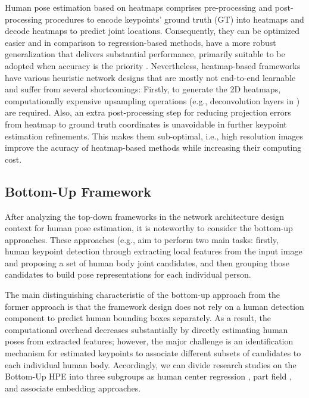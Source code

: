 Human pose estimation based on heatmaps comprises pre-processing and post-processing procedures to encode keypoints' ground truth (GT) into heatmaps and decode heatmaps to predict joint locations. Consequently, they can be optimized easier and in comparison to regression-based methods, have a more robust generalization that delivers substantial performance, primarily suitable to be adopted when accuracy is the priority \cite{pfister_flowing_2015}. Nevertheless, heatmap-based frameworks have various heuristic network designs that are mostly not end-to-end learnable and suffer from several shortcomings: Firstly, to generate the 2D heatmaps, computationally expensive upsampling operations (e.g., deconvolution layers in \cite{yixing_gao_user_2015}) are required. Also, an extra post-processing step for reducing projection errors from heatmap to ground truth coordinates is unavoidable in further keypoint estimation refinements. This makes them sub-optimal, i.e., high resolution images improve the acuracy of heatmap-based methods while increasing their computing cost.


\subsection{Bottom-Up Framework}
 
After analyzing the top-down frameworks in the network architecture design context for human pose estimation, it is noteworthy to consider the bottom-up approaches. These approaches (e.g.,\cite{micilotta_real-time_2006, cheng_higherhrnet_2020, fieraru_learning_2018, jin_differentiable_2020, kreiss_pifpaf_2019, nie_single-stage_2019,insafutdinov_arttrack_2017, insafutdinov_deepercut_2016, newell_associative_2017, pishchulin_deepcut_2016, tian_directpose_2019} aim to perform two main tasks: firstly, human keypoint detection through extracting local features from the input image and proposing a set of human body joint candidates, and then grouping those candidates to build pose representations for each individual person. 

The main distinguishing characteristic of the bottom-up approach from the former approach is that the framework design does not rely on a human detection component to predict human bounding boxes separately. As a result, the computational overhead decreases substantially by directly estimating human poses from extracted features; however, the major challenge is an identification mechanism for estimated keypoints to associate different subsets of candidates to each individual human body. Accordingly, we can divide research studies on the Bottom-Up HPE into three subgroups as human center regression \cite{geng_bottom-up_2021, nie_single-stage_2019, nie_human_2018}, part field \cite{jin_differentiable_2020, kreiss_pifpaf_2019, martinez_single-network_2019, insafutdinov_deepercut_2016, li_simple_2020}, and associate embedding \cite{cheng_higherhrnet_2020, jin_multi-person_2019, luo_rethinking_2021, newell_associative_2017} approaches. 

